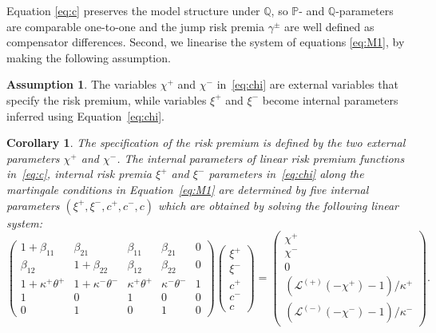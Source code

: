 \documentclass[11pt,a4paper]{article}
\numberwithin{equation}{section}
\newtheorem{corollary}[theorem]{Corollary}
\theoremstyle{remark}
\theoremstyle{definition}
\newtheorem{assumption}{Assumption}[section]
\begin{document}
Equation \eqref{eq:c} preserves the model structure under $\mathbb{Q}$, so $\mathbb{P}$- and $\mathbb{Q}$-parameters are comparable one-to-one and the jump risk premia $\gamma^{\pm}$ are well defined as compensator differences. Second, we linearise the system of equations \eqref{eq:M1}, by making the following assumption.

\begin{assumption}
The variables $\chi^+$ and $\chi^-$ in~\eqref{eq:chi} are external variables that specify the risk premium, while variables $\xi^+$ and $\xi^-$ become internal parameters inferred using Equation~\eqref{eq:chi}.
\end{assumption}

\begin{corollary}
  \label{cor:spec}
The specification of the risk premium is defined by the two external parameters $\chi^+$ and $\chi^-$.
The internal parameters of linear risk premium functions in~\eqref{eq:c}, internal risk premia $\xi^+$ and $\xi^-$ parameters in~\eqref{eq:chi} along the martingale conditions in Equation~\eqref{eq:M1} are determined by five internal parameters $(\xi^+, \xi^-, c^+, c^-, c)$ which are obtained by solving the following linear system:
    \begin{equation}\label{eq:system}
        \begin{pmatrix}
        1+\beta_{11} &   \beta_{21} & \beta_{11} & \beta_{21} & 0\\
        \beta_{12} & 1+\beta_{22} & \beta_{12} & \beta_{22} & 0\\
        1+\kappa^+\theta^+ & 1+\kappa^-\theta^- & \kappa^+\theta^+ & \kappa^-\theta^- & 1\\
        1&0&1&0&0\\
        0&1&0&1&0
        \end{pmatrix}  \begin{pmatrix}\xi^+\\ \xi^-\\ c^+\\ c^-\\ c \end{pmatrix} =
        \begin{pmatrix}
        \chi^+ \\ \chi^- \\ 0 \\ \left(\mathcal{L}^{(+)}(-\chi^+)-1\right)\big/ \kappa^+\\ \left(\mathcal{L}^{(-)}(-\chi^-)-1\right)\big/ \kappa^-
        \end{pmatrix}.
    \end{equation}
\end{corollary}
\end{document}

